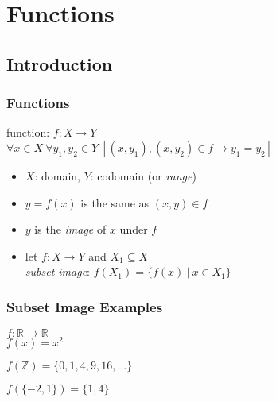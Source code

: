 \documentclass[dvipsnames]{beamer}
\begin{document}
\section{Functions}

\subsection{Introduction}

\begin{frame}
  \frametitle{Functions}

  \begin{definition}
    \alert{function}: $f: X \rightarrow Y$\\
    $\forall x \in X~\forall y_1,y_2 \in Y~
      [(x,y_1),(x,y_2) \in f \rightarrow y_1=y_2]$
  \end{definition}

  \medskip
  \begin{itemize}
    \item $X$: \alert{domain}, $Y$: \alert{codomain} (or \emph{range})

    \pause
    \medskip
    \item $y = f(x)$ is the same as $(x,y) \in f$
    \item $y$ is the \emph{image} of $x$ under $f$

    \pause
    \medskip
    \item let $f: X \rightarrow Y$ and $X_1 \subseteq X$\\
      \emph{subset image}: $f(X_1) = \{f(x)~|~x \in X_1\}$
 \end{itemize}
\end{frame}

\begin{frame}
  \frametitle{Subset Image Examples}

  \begin{example}
    $f: \mathbb{R} \rightarrow \mathbb{R}$\\
    $f(x) = x^2$

    \pause
    \bigskip
    $f(\mathbb{Z}) = \{0,1,4,9,16,\dots\}$

    \medskip
    $f(\{-2,1\}) = \{1,4\}$
  \end{example}
\end{frame}
\end{document}
